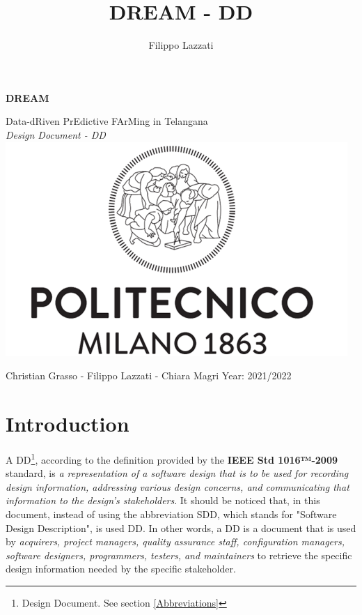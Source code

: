 \documentclass{article}
\title{DREAM - DD}
\author{Filippo Lazzati}
\begin{document}
\thispagestyle{empty} 
\begin{titlepage}
    \begin{center}
       {\Huge \textbf{DREAM}} %
       \vspace{0.5cm}
       \\
    \begin{LARGE}
        {Data-dRiven PrEdictive FArMing in Telangana}
        \vspace{1.0cm}
        \\
        {\textit{Design Document - DD}}
        \includegraphics[width=13cm]{logo/polimi.png}
       \vspace{1.5cm}
        
        {Christian Grasso - Filippo Lazzati - Chiara Magri}
       \vspace{0.5cm}
       {Year: 2021/2022}
       
    \end{LARGE}  
   \end{center}
\end{titlepage}
\newpage
\tableofcontents %
\newpage

\section{Introduction}
A DD\footnote{Design Document. See section \ref{Abbreviations}}, according to the definition provided by the \textbf{IEEE Std 1016™-2009} standard, is \textit{a representation of a software design that is to be used for recording design information, addressing various design concerns, and communicating that information to the design’s stakeholders}. It should be noticed that, in this document, instead of using the abbreviation SDD, which stands for "Software Design Description", is used DD. In other words, a DD is a document that is used by \textit{acquirers, project managers, quality assurance staff, configuration managers, software designers, programmers, testers, and maintainers} to retrieve the specific design information needed by the specific stakeholder.
\end{document}
